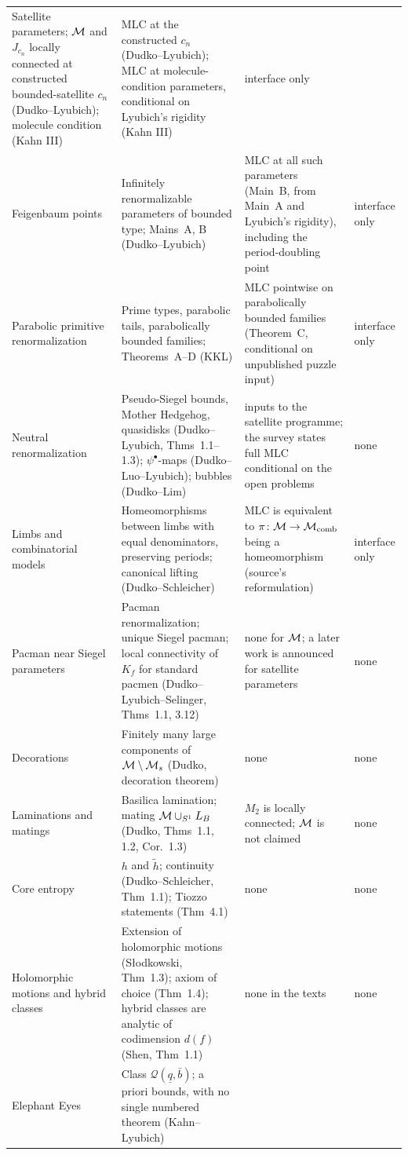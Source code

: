 \begin{table}[ht]
\begin{tabularx}{\textwidth}{@{}>{\raggedright\arraybackslash}p{}>{\raggedright\arraybackslash}X>{\raggedright\arraybackslash}p{}>{\raggedright\arraybackslash}p{}@{}}
Satellite parameters; $\mathcal M$ and $J_{c_n}$ locally connected at constructed bounded-satellite $c_n$ (Dudko--Lyubich); molecule condition (Kahn III) &
MLC at the constructed $c_n$ (Dudko--Lyubich); MLC at molecule-condition parameters, conditional on Lyubich's rigidity (Kahn III) &
interface only\\
Feigenbaum points &
Infinitely renormalizable parameters of bounded type; Mains~A, B (Dudko--Lyubich) &
MLC at all such parameters (Main~B, from Main~A and Lyubich's rigidity), including the period-doubling point &
interface only\\
Parabolic primitive renormalization &
Prime types, parabolic tails, parabolically bounded families; Theorems~A--D (KKL) &
MLC pointwise on parabolically bounded families (Theorem~C, conditional on unpublished puzzle input) &
interface only\\
Neutral renormalization &
Pseudo-Siegel bounds, Mother Hedgehog, quasidisks (Dudko--Lyubich, Thms~1.1--1.3); $\psi^\bullet$-maps (Dudko--Luo--Lyubich); bubbles (Dudko--Lim) &
inputs to the satellite programme; the survey states full MLC conditional on the open problems &
none\\
Limbs and combinatorial models &
Homeomorphisms between limbs with equal denominators, preserving periods; canonical lifting (Dudko--Schleicher) &
MLC is equivalent to $\pi\colon\mathcal M\to\mathcal M_{\rm comb}$ being a homeomorphism (source's reformulation) &
interface only\\
Pacman near Siegel parameters &
Pacman renormalization; unique Siegel pacman; local connectivity of $K_f$ for standard pacmen (Dudko--Lyubich--Selinger, Thms~1.1, 3.12) &
none for $\mathcal M$; a later work is announced for satellite parameters &
none\\
Decorations &
Finitely many large components of $\mathcal M\setminus\mathcal M_s$ (Dudko, decoration theorem) &
none &
none\\
Laminations and matings &
Basilica lamination; mating $\mathcal M\cup_{S^1}L_B$ (Dudko, Thms~1.1, 1.2, Cor.~1.3) &
$M_2$ is locally connected; $\mathcal M$ is not claimed &
none\\
Core entropy &
$h$ and $\widetilde h$; continuity (Dudko--Schleicher, Thm~1.1); Tiozzo statements (Thm~4.1) &
none &
none\\
Holomorphic motions and hybrid classes &
Extension of holomorphic motions (Sło\-dkowski, Thm~1.3); axiom of choice (Thm~1.4); hybrid classes are analytic of codimension $d(f)$ (Shen, Thm~1.1) &
none in the texts &
none\\
Elephant Eyes &
Class $\mathcal Q(\underline q,\bar b)$; a priori bounds, with no single numbered theorem (Kahn--Lyubich) &

\end{tabularx}
\end{table}

